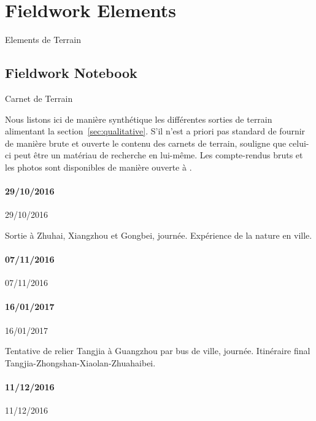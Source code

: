 




\section{Fieldwork Elements}{Elements de Terrain}

\label{app:sec:qualitative}



\subsection{Fieldwork Notebook}{Carnet de Terrain}

Nous listons ici de manière synthétique les différentes sorties de terrain alimentant la section~\ref{sec:qualitative}. S'il n'est a priori pas standard de fournir de manière brute et ouverte le contenu des carnets de terrain, \cite{goffman1989fieldwork} souligne que celui-ci peut être un matériau de recherche en lui-même. Les compte-rendus bruts et les photos sont disponibles de manière ouverte à \texttt{}.



\paragraph{29/10/2016}{29/10/2016}

Sortie à Zhuhai, Xiangzhou et Gongbei, journée. Expérience de la nature en ville.


\paragraph{07/11/2016}{07/11/2016}


\paragraph{16/01/2017}{16/01/2017}

Tentative de relier Tangjia à Guangzhou par bus de ville, journée. Itinéraire final Tangjia-Zhongshan-Xiaolan-Zhuahaibei.


\paragraph{11/12/2016}{11/12/2016}


